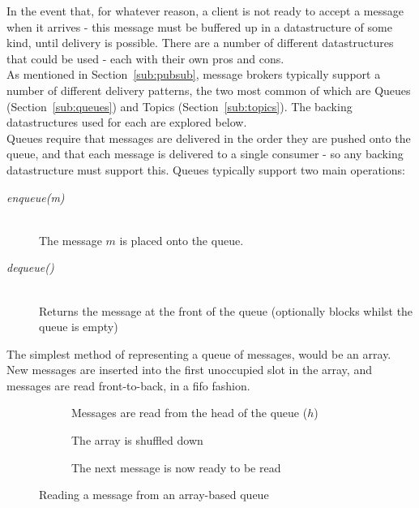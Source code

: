 In the event that, for whatever reason, a client is not ready to accept a
message when it arrives - this message must be buffered up in a datastructure of
some kind, until delivery is possible. There are a number of different
datastructures that could be used - each with their own pros and cons. \\

As mentioned in Section~\ref{sub:pubsub}, message brokers typically support a
number of different delivery patterns, the two most common of which are Queues
(Section~\ref{sub:queues}) and Topics (Section~\ref{sub:topics}). The backing
datastructures used for each are explored below. \\

Queues require that messages are delivered in the order they are pushed onto the
queue, and that each message is delivered to a single consumer - so any backing
datastructure must support this. Queues typically support two main operations:

\begin{description}
  \item[\textit{enqueue(m)}] \hfill \\
    The message $m$ is placed onto the queue.
  \item[\textit{dequeue()}] \hfill \\
    Returns the message at the front of the queue (optionally blocks whilst the queue is empty)
\end{description}

The simplest method of representing a queue of messages, would be an array. New
messages are inserted into the first unoccupied slot in the array, and messages
are read front-to-back, in a \gls{fifo} fashion.

\begin{figure}[H]
  \centering
  \begin{subfigure}[b]{\textwidth}
    \centering
    
    \caption{Messages are read from the head of the queue ($h$)}
    \label{fig:tikz:queueArrayInitial}
  \end{subfigure}

  \begin{subfigure}[b]{\textwidth}
    \centering
    
    \caption{The array is shuffled down}
    \label{fig:tikz:queueArrayHeadRead}
  \end{subfigure}

  \begin{subfigure}[b]{\textwidth}
    \centering
    
    \caption{The next message is now ready to be read}
    \label{fig:tikz:queueArrayPostShuffle}
  \end{subfigure}
  \caption{Reading a message from an array-based queue}
  \label{fig:tikz:queueArray}
\end{figure}

